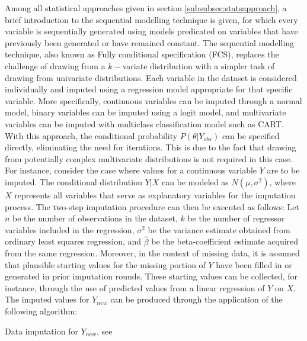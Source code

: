 Among all statistical approaches given in section \ref{subsubsec:statsapproach}, a brief introduction to the sequential modelling technique is given, for which every variable is sequentially generated using models predicated on variables that have previously been generated or have remained constant. The sequential modelling technique, also known as Fully conditional specification (FCS), replaces the challenge of drawing from a $k-$variate distribution with a simpler task of drawing from univariate distributions. Each variable in the dataset is considered individually and imputed using a regression model appropriate for that specific variable. More specifically, continuous variables can be imputed through a normal model, binary variables can be imputed using a logit model, and multivariate variables can be imputed with multiclass classification model such as CART. With this approach, the conditional probability $P(\theta|Y_{obs})$ can be specified directly, eliminating the need for iterations. This is due to the fact that drawing from potentially complex multivariate distributions is not required in this case. For instance, consider the case where values for a continuous variable $Y$ are to be imputed. The conditional distribution $Y|X$ can be modeled as $N(\mu ,\sigma^2)$, where $X$ represents all variables that serve as explanatory variables for the imputation process. The two-step imputation procedure can then be executed as follows: Let $n$ be the number of observations in the dataset, $k$ be the number of regressor variables included in the regression, $\sigma^2$ be the variance estimate obtained from ordinary least squares regression, and $\hat{\beta}$ be the beta-coefficient estimate acquired from the same regression. Moreover, in the context of missing data, it is assumed that plausible starting values for the missing portion of $Y$ have been filled in or generated in prior imputation rounds. These starting values can be collected, for instance, through the use of predicted values from a linear regression of $Y$ on $X$. The imputed values for $Y_{new}$ can be produced through the application of the following algorithm:
\begin{algorithm}[H]
\caption{Data imputation for $Y_{new}$, see \cite{drechsler2011synthetic}}
\end{algorithm}

